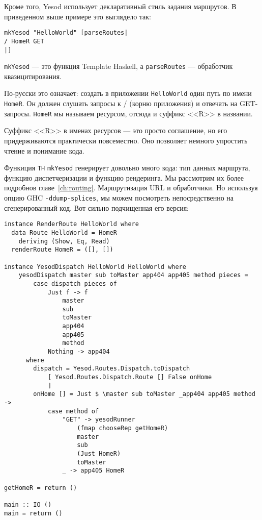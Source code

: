 Кроме того, Yesod использует декларативный стиль задания маршрутов. В приведенном выше
примере это выглядело так:

\begin{lstlisting}
mkYesod "HelloWorld" [parseRoutes|
/ HomeR GET
|]
\end{lstlisting}

\lstinline!mkYesod! --- это функция Template Haskell, а \lstinline!parseRoutes! --- 
обработчик квазицитирования.

По-русски это означает: создать в приложении \texttt{HelloWorld} один путь по имени
\lstinline!HomeR!. Он должен слушать запросы к / (корню приложения) и отвечать на
GET-запросы.   \lstinline!HomeR! мы называем
ресурсом, отсюда и суффикс <<R>> в названии.

Суффикс <<R>> в именах ресурсов --- это просто соглашение, но его придерживаются
практически повсеместно. Оно позволяет немного упростить чтение и понимание кода.

Функиция \texttt{TH} \lstinline!mkYesod! генерирует довольно много кода: тип данных
маршрута, функцию диспетчеризации и функцию рендеринга. Мы рассмотрим их более подробнов главе~\ref{ch:routing}.
Маршрутизация URL и обработчики. Но используя опцию GHC \lstinline'-ddump-splices', мы
можем посмотреть непосредственно на сгенерированный код. Вот сильно подчищенная его
версия:

\begin{lstlisting}
instance RenderRoute HelloWorld where
  data Route HelloWorld = HomeR
    deriving (Show, Eq, Read)
  renderRoute HomeR = ([], [])

instance YesodDispatch HelloWorld HelloWorld where
    yesodDispatch master sub toMaster app404 app405 method pieces =
        case dispatch pieces of
            Just f -> f
                master
                sub
                toMaster
                app404
                app405
                method
            Nothing -> app404
      where
        dispatch = Yesod.Routes.Dispatch.toDispatch
            [ Yesod.Routes.Dispatch.Route [] False onHome
            ]
        onHome [] = Just $ \master sub toMaster _app404 app405 method ->
            case method of
                "GET" -> yesodRunner
                    (fmap chooseRep getHomeR)
                    master
                    sub
                    (Just HomeR)
                    toMaster
                _ -> app405 HomeR

getHomeR = return ()

main :: IO ()
main = return ()
\end{lstlisting}

